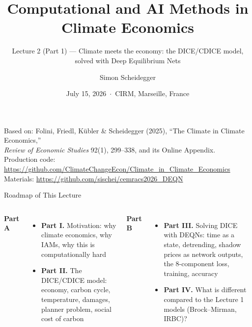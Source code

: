 \documentclass[aspectratio=169,11pt]{beamer}
\title[CEMRACS 2026 $\cdot$ DICE]
{Computational and AI Methods in Climate Economics}
\subtitle{Lecture 2 (Part 1) --- Climate meets the economy: the DICE/CDICE model, solved with Deep Equilibrium Nets}
\author{Simon Scheidegger}
\institute[HEC Lausanne]{HEC Lausanne $\cdot$ Grantham Research Institute, LSE}
\date{July 15, 2026 \,$\cdot$\, CIRM, Marseille, France}
\begin{document}

{
\begin{frame}
\titlepage
\vspace{-0.4cm}
\begin{center}
{\footnotesize Based on: Folini, Friedl, K\"ubler \& Scheidegger (2025), ``The Climate in Climate Economics,''\\
\emph{Review of Economic Studies} 92(1), 299--338, and its Online Appendix.}\\[4pt]
{\footnotesize Production code: \url{https://github.com/ClimateChangeEcon/Climate_in_Climate_Economics}}\\[2pt]
{\footnotesize Materials: \url{https://github.com/sischei/cemracs2026_DEQN}}
\end{center}
\end{frame}
}

\begin{frame}{Roadmap of This Lecture}
\vspace{0.2em}
\begin{columns}[T]
\textbf{Part A}
\begin{itemize}
    \item \textbf{Part I.} Motivation: why climate economics, why IAMs, why this is computationally hard
    \item \textbf{Part II.} The DICE/CDICE model: economy, carbon cycle, temperature, damages, planner problem, social cost of carbon
\end{itemize}

\textbf{Part B}
\begin{itemize}
    \item \textbf{Part III.} Solving DICE with DEQNs: time as a state, detrending, shadow prices as network outputs, the 8-component loss, training, accuracy
    \item \textbf{Part IV.} What is different compared to the Lecture 1 models (Brock--Mirman, IRBC)?
\end{itemize}
\end{columns}
\end{frame}
\end{document}
